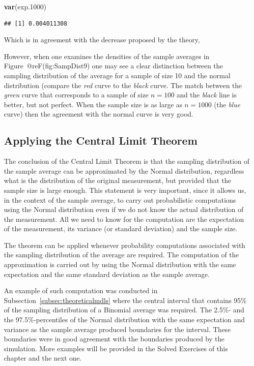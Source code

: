 \documentclass[
]{krantz}
\makeatletter
\newenvironment{Shaded}{\begin{snugshade}}{\end{snugshade}}
\newcommand{\FloatTok}[1]{\textcolor[rgb]{0.00,0.00,0.81}{#1}}
\newcommand{\KeywordTok}[1]{\textcolor[rgb]{0.13,0.29,0.53}{\textbf{#1}}}
\newcommand{\NormalTok}[1]{#1}
\newenvironment{kframe}{%
\medskip{}
\setlength{\fboxsep}{.8em}
 \def\at@end@of@kframe{}%
 \ifinner\ifhmode%
  \def\at@end@of@kframe{\end{minipage}}%
  \begin{minipage}{\columnwidth}%
 \fi\fi%
 \def\FrameCommand##1{\hskip\@totalleftmargin \hskip-\fboxsep
 \colorbox{shadecolor}{##1}\hskip-\fboxsep
     \hskip-\linewidth \hskip-\@totalleftmargin \hskip\columnwidth}%
 \MakeFramed {\advance\hsize-\width
   \@totalleftmargin\z@ \linewidth\hsize
   \@setminipage}}%
 {\par\unskip\endMakeFramed%
 \at@end@of@kframe}
\renewenvironment{Shaded}{\begin{kframe}}{\end{kframe}}
\theoremstyle{definition}
\theoremstyle{definition}
\theoremstyle{definition}
\theoremstyle{remark}
\makeatother
\begin{document}
\begin{Shaded}
\begin{Highlighting}[]
\KeywordTok{var}\NormalTok{(exp}\FloatTok{.1000}\NormalTok{)}
\end{Highlighting}
\end{Shaded}

\begin{verbatim}
## [1] 0.004011308
\end{verbatim}

Which is in agreement with the decrease proposed by the theory,

However, when one examines the densities of the sample averages in
Figure~@reF(fig:SampDist9) one may see a clear distinction between the
sampling distribution of the average for a sample of size 10 and the
normal distribution (compare the \emph{red} curve to the \emph{black} curve. The
match between the \emph{green} curve that corresponds to a sample of size
\(n=100\) and the \emph{black} line is better, but not perfect. When the sample
size is as large as \(n=1000\) (the \emph{blue} curve) then the agreement with
the normal curve is very good.

\hypertarget{applying-the-central-limit-theorem}{%
\subsection{Applying the Central Limit Theorem}\label{applying-the-central-limit-theorem}}

The conclusion of the Central Limit Theorem is that the sampling
distribution of the sample average can be approximated by the Normal
distribution, regardless what is the distribution of the original
measurement, but provided that the sample size is large enough. This
statement is very important, since it allows us, in the context of the
sample average, to carry out probabilistic computations using the Normal
distribution even if we do not know the actual distribution of the
measurement. All we need to know for the computation are the expectation
of the measurement, its variance (or standard deviation) and the sample
size.

The theorem can be applied whenever probability computations associated
with the sampling distribution of the average are required. The
computation of the approximation is carried out by using the Normal
distribution with the same expectation and the same standard deviation
as the sample average.

An example of such computation was conducted in
Subsection~\ref{subsec:theoreticalmdls} where the central interval that
contains 95\% of the sampling distribution of a Binomial average was
required. The 2.5\%- and the 97.5\%-percentiles of the Normal distribution
with the same expectation and variance as the sample average produced
boundaries for the interval. These boundaries were in good agreement
with the boundaries produced by the simulation. More examples will be
provided in the Solved Exercises of this chapter and the next one.
\end{document}
